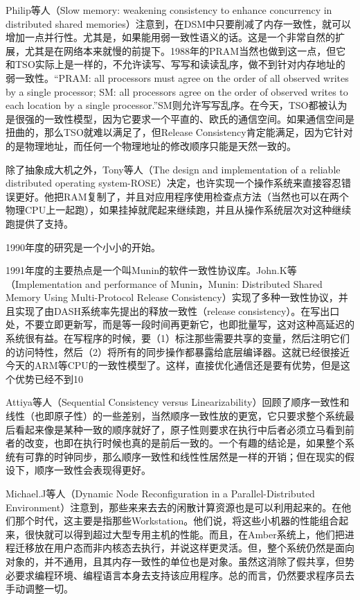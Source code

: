 \documentclass[a4paper,twoside]{scrbook}
\begin{document}
Philip等人（Slow memory: weakening consistency to enhance concurrency in distributed shared memories）注意到，在DSM中只要削减了内存一致性，就可以增加一点并行性。尤其是，如果能用弱一致性语义的话。这是一个非常自然的扩展，尤其是在网络本来就慢的前提下。1988年的PRAM当然也做到这一点，但它和TSO实际上是一样的，不允许读写、写写和读读乱序，做不到针对内存地址的弱一致性。“PRAM: all processors must agree on the order of all observed writes by a single processor; SM: all processors agree on the order of observed writes to each location by a single processor.”SM则允许写写乱序。在今天，TSO都被认为是很强的一致性模型，因为它要求一个平直的、欧氏的通信空间。如果通信空间是扭曲的，那么TSO就难以满足了，但Release Consistency肯定能满足，因为它针对的是物理地址，而任何一个物理地址的修改顺序只能是天然一致的。

除了抽象成大机之外，Tony等人（The design and implementation of a reliable distributed operating system-ROSE）决定，也许实现一个操作系统来直接容忍错误更好。他把RAM复制了，并且对应用程序使用检查点方法（当然也可以在两个物理CPU上一起跑），如果挂掉就爬起来继续跑，并且从操作系统层次对这种继续跑提供了支持。

1990年度的研究是一个小小的开始。

1991年度的主要热点是一个叫Munin的软件一致性协议库。John.K等（Implementation and performance of Munin，Munin: Distributed Shared Memory Using Multi-Protocol Release Consistency）实现了多种一致性协议，并且实现了由DASH系统率先提出的释放一致性（release consistency）。在写出口处，不要立即更新写，而是等一段时间再更新它，也即批量写，这对这种高延迟的系统很有益。在写程序的时候，要（1）标注那些需要共享的变量，然后注明它们的访问特性，然后（2）将所有的同步操作都暴露给底层编译器。这就已经很接近今天的ARM等CPU的一致性模型了。这样，直接优化通信还是要有优势，但是这个优势已经不到10%

Attiya等人（Sequential Consistency versus Linearizability）回顾了顺序一致性和线性（也即原子性）的一些差别，当然顺序一致性放的更宽，它只要求整个系统最后看起来像是某种一致的顺序就好了，原子性则要求在执行中后者必须立马看到前者的改变，也即在执行时候也真的是前后一致的。一个有趣的结论是，如果整个系统有可靠的时钟同步，那么顺序一致性和线性性居然是一样的开销；但在现实的假设下，顺序一致性会表现得更好。

Michael.J等人（Dynamic Node Reconfiguration in a Parallel-Distributed Environment）注意到，那些来来去去的闲散计算资源也是可以利用起来的。在他们那个时代，这主要是指那些Workstation。他们说，将这些小机器的性能组合起来，很快就可以得到超过大型专用主机的性能。而且，在Amber系统上，他们把进程迁移放在用户态而非内核态去执行，并说这样更灵活。但，整个系统仍然是面向对象的，并不通用，且其内存一致性的单位也是对象。虽然这消除了假共享，但势必要求编程环境、编程语言本身去支持该应用程序。总的而言，仍然要求程序员去手动调整一切。
\end{document}
